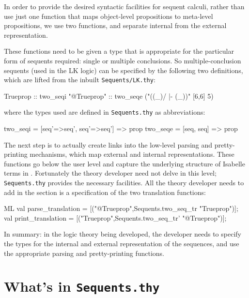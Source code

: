 In order to provide the desired syntactic facilities for sequent
calculi, rather than use just one function that maps object-level
propositions to meta-level propositions, we use two functions, and
separate internal from the external representation. 

These functions need to be given a type that is appropriate for the particular
form of sequents required: single or multiple conclusions.  So
multiple-conclusion sequents (used in the LK logic) can be
specified by the following two definitions, which are lifted from the inbuilt
{\tt Sequents/LK.thy}:
\begin{ttbox}
 Trueprop       :: two_seqi
 "@Trueprop"    :: two_seqe   ("((_)/ |- (_))" [6,6] 5)
\end{ttbox}
%
where the types used are defined in {\tt Sequents.thy} as
abbreviations:
\begin{ttbox}
 two_seqi = [seq'=>seq', seq'=>seq'] => prop
 two_seqe = [seq, seq] => prop
\end{ttbox}

The next step is to actually create links into the low-level parsing
and pretty-printing mechanisms, which map external and internal
representations. These functions go below the user level and capture
the underlying structure of Isabelle terms in \ML{}\@.  Fortunately the
theory developer need not delve in this level; {\tt Sequents.thy}
provides the necessary facilities. All the theory developer needs to
add in the \ML{} section is a specification of the two translation
functions:
\begin{ttbox}
ML
val parse_translation = [("@Trueprop",Sequents.two_seq_tr "Trueprop")];
val print_translation = [("Trueprop",Sequents.two_seq_tr' "@Trueprop")];
\end{ttbox}

In summary: in the logic theory being developed, the developer needs
to specify the types for the internal and external representation of
the sequences, and use the appropriate parsing and pretty-printing
functions. 

\section{What's in \texttt{Sequents.thy}}

